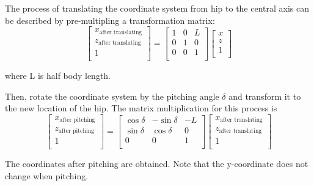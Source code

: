 The process of translating the coordinate system from hip to the central axis can be described by pre-multipling a transformation matrix:
\begin{equation}
   \begin{bmatrix}
   x_\text{after translating} \\
   z_\text{after translating} \\
   1                          \\
   \end{bmatrix}
   =
   \begin{bmatrix}
   1 & 0 & L \\
   0 & 1 & 0 \\
   0 & 0 & 1 \\
   \end{bmatrix}
   \begin{bmatrix}
   x \\
   z \\
   1 \\
   \end{bmatrix}
\end{equation}

where L is half body length.

Then, rotate the coordinate system by the pitching angle $\delta$ and transform it to the new location of the hip. The matrix multiplication for this process is
\begin{equation}
   \begin{bmatrix}
   x_\text{after pitching} \\
   z_\text{after pitching} \\
   1                       \\
   \end{bmatrix}
   =
   \begin{bmatrix}
   \cos\delta & -\sin\delta & -L \\
   \sin\delta & \cos\delta & 0 \\
   0 & 0 & 1 \\
   \end{bmatrix}
   \begin{bmatrix}
   x_\text{after translating} \\
   z_\text{after translating} \\
   1                          \\
   \end{bmatrix}
\end{equation}

The coordinates after pitching are obtained. Note that the y-coordinate does not change when pitching.


